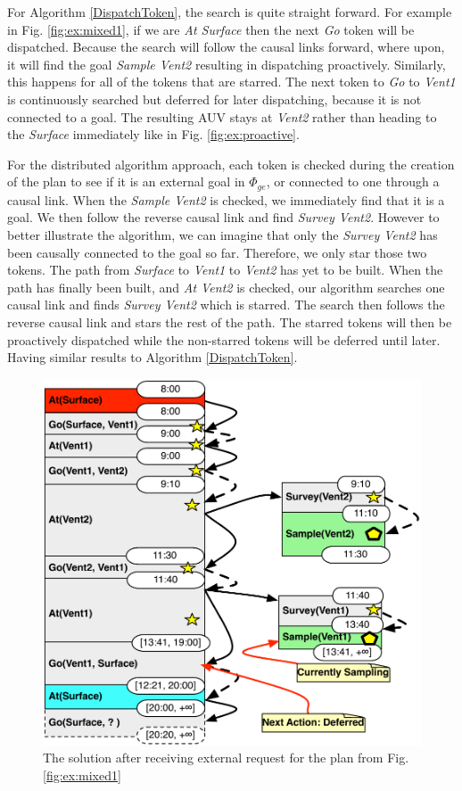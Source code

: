 For Algorithm \ref{DispatchToken}, the search is quite straight
forward. For example in Fig. \ref{fig:ex:mixed1}, if we are {\em At
Surface} then the next {\em Go} token will be dispatched. Because the
search will follow the causal links forward, where upon, it will find
the goal {\em Sample Vent2} resulting in dispatching proactively.
Similarly, this happens for all of the tokens that are starred. The
next token to {\em Go} to {\em Vent1} is continuously searched but deferred for later dispatching,
because it is not connected to a goal. The resulting
AUV stays at {\em Vent2} rather than heading to the {\em Surface}
immediately like in Fig. \ref{fig:ex:proactive}.

For the distributed algorithm approach, each token is checked during
the creation of the plan to see if it is an external goal in
$\Phi_{ge}$, or connected to one through a causal link. When the {\em
Sample Vent2} is checked, we immediately find that it is a goal. We then
follow the reverse causal link and find {\em Survey Vent2}.  However to
better illustrate the algorithm, we can imagine that only the {\em Survey
Vent2} has been causally connected to the goal so far. Therefore, we
only star those two tokens. The path from {\em Surface} to {\em Vent1}
to {\em Vent2} has yet to be built. When the path has finally been
built, and {\em At Vent2} is checked, our algorithm searches one
causal link and finds {\em Survey Vent2} which is starred. The search
then follows the reverse causal link and stars the rest of the
path. The starred tokens will then be proactively dispatched while the
non-starred tokens will be deferred until later. Having similar
results to Algorithm \ref{DispatchToken}.

\begin{figure}
  \centering
  \includegraphics[width=0.8\columnwidth]{figs/example_MixedUpdate}
  \caption{\small The solution after receiving external request for
    the plan from Fig. \ref{fig:ex:mixed1}} 
  \label{fig:ex:mixed2}
\end{figure}

